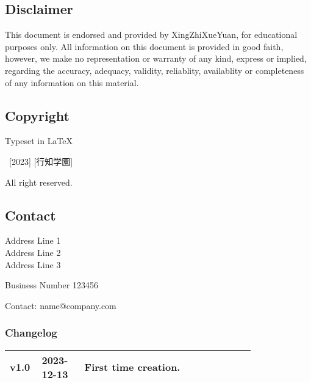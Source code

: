 \documentclass[
	a4paper, %
	12pt, %
]{CSSullivanBusinessReport}
\begin{document}
\begin{twothirdswidth} %
	\footnotesize %
	
	\subsection*{Disclaimer}

This document is endorsed and provided by XingZhiXueYuan, for educational purposes only. All information on this document is provided in good faith, however, we make no representation or warranty of any kind, express or implied, regarding the accuracy, adequacy, validity, reliablity, availablity or completeness of any information on this material.

	\subsection*{Copyright}
		
	Typeset in \LaTeX\ 
	
	\textcopyright~[2023] [行知学園] 
	
	All right reserved.

	
	\subsection*{Contact}
	
	Address Line 1\\
	Address Line 2\\
	Address Line 3
	
	Business Number 123456
	
	Contact: name@company.com
	
	\vfill %
	
	\subsubsection*{Changelog}
	
	\scriptsize %
	
	\begin{tabular}{@{} L{0.05\linewidth} L{0.15\linewidth} L{0.6\linewidth} @{}} %
		\toprule
		v1.0  & 2023-12-13 & First time creation.\\
		\bottomrule
	\end{tabular}
\end{twothirdswidth}
\end{document}
